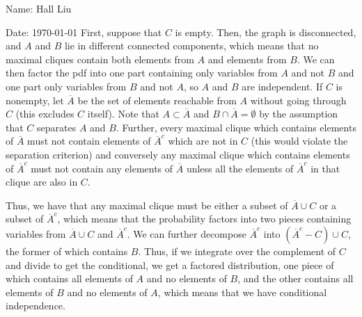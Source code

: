 \documentclass{article}
\newcommand{\conj}{\overline}
\begin{document}
Name: Hall Liu

Date: \today 
\vspace{1.5cm}
First, suppose that $C$ is empty. Then, the graph is disconnected, and $A$ and $B$ lie in different connected components, which means that no maximal cliques contain both elements from $A$ and elements from $B$. We can then factor the pdf into one part containing only variables from $A$ and not $B$ and one part only variables from $B$ and not $A$, so $A$ and $B$ are independent. If $C$ is nonempty, let $\conj{A}$ be the set of elements reachable from $A$ without going through $C$ (this excludes $C$ itself). Note that $A\subset \conj{A}$ and $B\cap\conj{A}=\emptyset$ by the assumption that $C$ separates $A$ and $B$. Further, every maximal clique which contains elements of $\conj{A}$ must not contain elements of $\conj{A}^c$ which are not in $C$ (this would violate the separation criterion) and conversely any maximal clique which contains elements of $\conj{A}^c$ must not contain any elements of $\conj{A}$ unless all the elements of $\conj{A}^c$ in that clique are also in $C$. 

Thus, we have that any maximal clique must be either a subset of $\conj{A}\cup C$ or a subset of $\conj{A}^c$, which means that the probability factors into two pieces containing variables from $\conj{A}\cup C$ and $\conj{A}^c$. We can further decompose $\conj{A}^c$ into $(\conj{A}^c-C)\cup C$, the former of which contains $B$. Thus, if we integrate over the complement of $C$ and divide to get the conditional, we get a factored distribution, one piece of which contains all elements of $A$ and no elements of $B$, and the other contains all elements of $B$ and no elements of $A$, which means that we have conditional independence.
\end{document}
